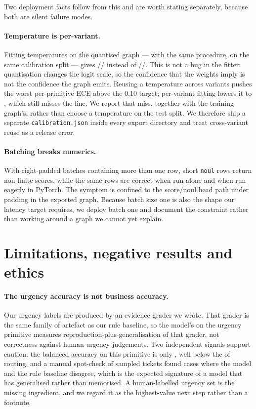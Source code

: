\documentclass[11pt,a4paper]{article}
\begin{document}
Two deployment facts follow from this and are worth stating separately, because both are silent failure modes.

\paragraph{Temperature is per-variant.} Fitting temperatures on the quantised graph --- with the same procedure, on the same calibration split --- gives \TChoiceOnnx/\TScoreOnnx/\TNoulOnnx{} instead of \TChoice/\TScore/\TNoul{}. This is not a bug in the fitter: quantisation changes the logit scale, so the confidence that the weights imply is not the confidence the graph emits. Reusing a temperature across variants pushes the worst per-primitive ECE above the \num{0.10} target; per-variant fitting lowers it to \EceWorstOnnx{}, which still misses the line. We report that miss, together with the training graph's, rather than choose a temperature on the test split. We therefore ship a separate \texttt{calibration.json} inside every export directory and treat cross-variant reuse as a release error.

\paragraph{Batching breaks numerics.} With right-padded batches containing more than one row, short \texttt{noul} rows return non-finite scores, while the same rows are correct when run alone and when run eagerly in PyTorch. The symptom is confined to the score/noul head path under padding in the exported graph. Because batch size one is also the shape our latency target requires, we deploy batch one and document the constraint rather than working around a graph we cannot yet explain.

\section{Limitations, negative results and ethics}

\paragraph{The urgency accuracy is not business accuracy.} Our urgency labels are produced by an evidence grader we wrote. That grader is the same family of artefact as our rule baseline, so the model's \AccScore{} on the urgency primitive measures reproduction-plus-generalisation of that grader, not correctness against human urgency judgements. Two independent signals support caution: the balanced accuracy on this primitive is only \BAccScore{}, well below the \BAccChoice{} of routing, and a manual spot-check of \SelfCheckN{} sampled tickets found \SelfCheckDisagree{} cases where the model and the rule baseline disagree, which is the expected signature of a model that has generalised rather than memorised. A human-labelled urgency set is the missing ingredient, and we regard it as the highest-value next step rather than a footnote.
\end{document}
